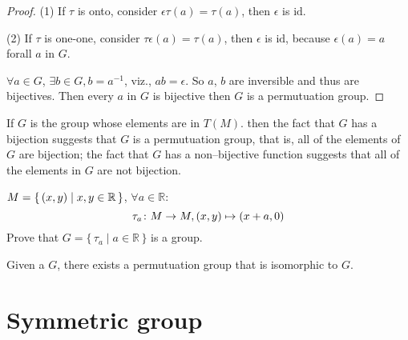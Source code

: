 \documentclass[../main.tex]{subfiles}
\begin{document}
\begin{proof}
	(1) If \(\tau \) is onto, consider \( \epsilon\tau(a) = \tau (a)\), then \(\epsilon\) is \( \text{id}\).

	\smallskip
	(2) If \( \tau\) is one-one, consider \(\tau\epsilon (a) =\tau (a)\), then \(\epsilon\) is \( \text{id}\), because \(\epsilon (a) = a\) forall \(a\) in \(G\).

	\(\forall a \in G\), \( \exists b \in G , b = a ^{-1}\), viz., \( a b =\epsilon\). So \(a\), \(b\) are inversible and thus are
	bijectives. Then every \(a\) in \(G\) is bijective then \(G\) is a permutuation group.
\end{proof}

If \(G\) is the group whose elements are in \(T(M)\). then the fact that \(G\) has a bijection suggests that \(G\) is a permutuation group, that is, all of the elements of \(G\) are bijection; the fact that \(G\) has a non--bijective function suggests that all of the elements in \(G\) are not bijection.

\begin{exam}
	\(M = \{ \, (x,y) \mid x, y \in \mathbb{R} \, \}\), \(\forall a \in \mathbb{R}\):
	\[
		\tau_{a} \colon M \to M , (x,y) \mapsto (x + a, 0)
		\]
		Prove that \(G = \{ \,\tau _{a} \mid a \in \mathbb{R} \, \}\) is a group.
\end{exam}

\begin{thm}[Cayley]\label{Cayley} 
	Given a \(G\), there exists a permutuation group that is isomorphic to \(G\).
\end{thm}

\section{Symmetric group}
\label{sec:Symmetric group}
\end{document}
